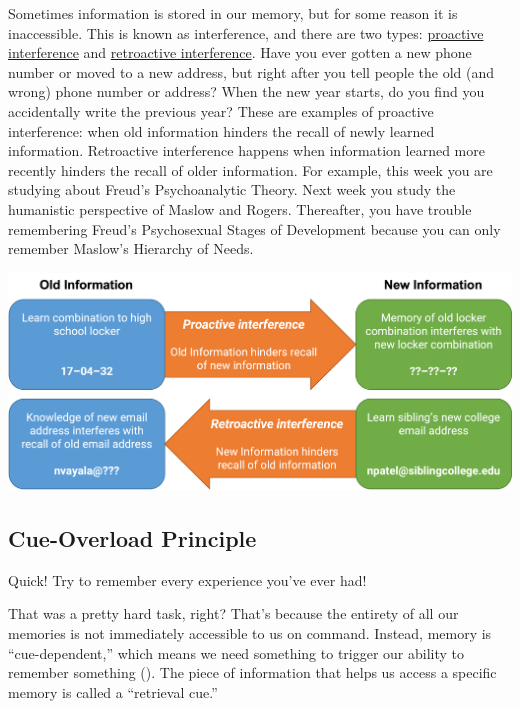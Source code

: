 \documentclass[
]{krantz}
\begin{document}
Sometimes information is stored in our memory, but for some reason it is inaccessible. This is known as interference, and there are two types: \hyperref[proactive-interference]{proactive interference} and \hyperref[retroactive-interference]{retroactive interference}. Have you ever gotten a new phone number or moved to a new address, but right after you tell people the old (and wrong) phone number or address? When the new year starts, do you find you accidentally write the previous year? These are examples of proactive interference: when old information hinders the recall of newly learned information. Retroactive interference happens when information learned more recently hinders the recall of older information. For example, this week you are studying about Freud's Psychoanalytic Theory. Next week you study the humanistic perspective of Maslow and Rogers. Thereafter, you have trouble remembering Freud's Psychosexual Stages of Development because you can only remember Maslow's Hierarchy of Needs.

\begin{center}\includegraphics[width=0.9\linewidth]{images/ch6/fig4} \end{center}

\subsection*{Cue-Overload Principle}\label{cue-overload-principle}


Quick! Try to remember every experience you've ever had!

That was a pretty hard task, right? That's because the entirety of all our memories is not immediately accessible to us on command. Instead, memory is ``cue-dependent,'' which means we need something to trigger our ability to remember something (). The piece of information that helps us access a specific memory is called a ``retrieval cue.''
\end{document}
